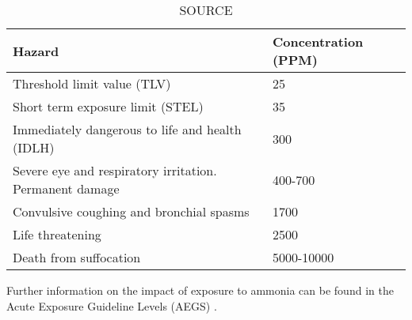 {\begin{table}[!htbp]
	\begin{center} 
		\caption{SOURCE}
		
		\begin{tabular}{ |p{9.5cm}||p{3.7cm}|  }
			\hline
			Hazard & Concentration (PPM)\\
			\hline
			Threshold limit value (TLV) & 25\\
			Short term exposure limit (STEL)& 35\\
			Immediately dangerous to life and health (IDLH)&300 \\
			Severe eye and respiratory irritation. Permanent damage  &400-700\\
			Convulsive coughing and bronchial spasms &1700\\
			Life threatening   &2500 \\
			Death from suffocation  &5000-10000 \\
			\hline
		\end{tabular}
	\end{center}
\end{table}


Further information on the impact of exposure to ammonia can be found in the Acute Exposure Guideline Levels (AEGS) \cite{Michaels1998}.

}
